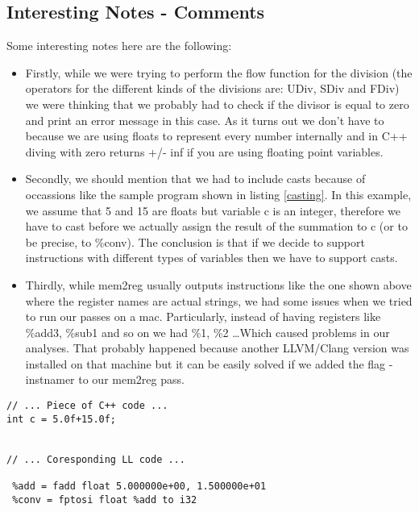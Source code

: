 \subsection*{Interesting Notes - Comments}
Some interesting notes here are the following:



\begin{itemize}

  \item Firstly, while we were trying to perform the flow function for the division (the operators for the different kinds of the divisions are: UDiv, SDiv and FDiv) we were thinking that we probably had to check if the divisor is equal to zero and print an error message in this case. As it turns out we don't have to because we are using floats to represent every number internally and in C++ diving with zero returns +/- inf if you are using floating point variables.
  \item Secondly, we should mention that we had to include casts because of occassions like the sample program shown in listing \ref{casting}. In this example, we assume that 5 and 15 are floats but variable c is an integer, therefore we have to cast before we actually assign the result of the summation to c (or to be precise, to \%conv). The conclusion is that if we decide to support instructions with different types of variables then we have to support casts.
  
  \item Thirdly, while mem2reg usually outputs instructions like the one shown above where the register names are actual strings, we had some issues when we tried to run our passes on a mac. Particularly, instead of having registers like \%add3, \%sub1 and so on we had \%1, \%2 \ldots Which caused problems in our analyses. That probably happened because another LLVM/Clang version was installed on that machine but it can be easily solved if we added the flag -instnamer to our mem2reg pass.

\end{itemize}


\begin{lstlisting}[caption=value preservance inside casts, label=casting]
// ... Piece of C++ code ...
int c = 5.0f+15.0f;


// ... Coresponding LL code ...

 %add = fadd float 5.000000e+00, 1.500000e+01
 %conv = fptosi float %add to i32

\end{lstlisting}























  